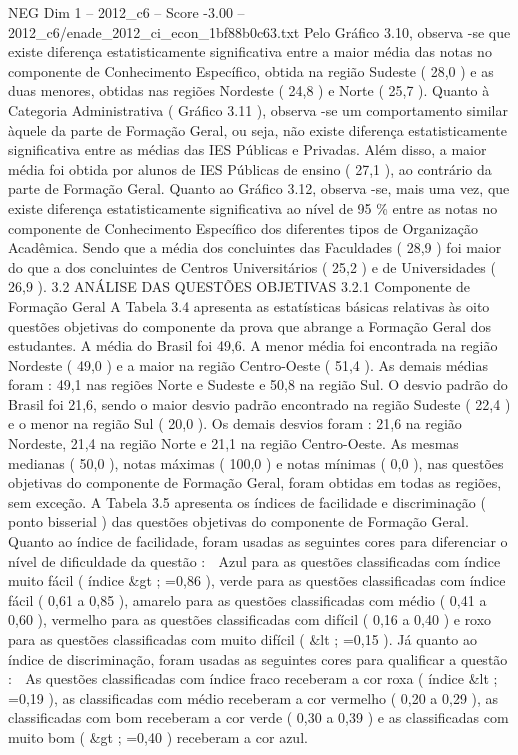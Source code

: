 \begin{textsample}{NEG Dim 1 – 2012\_c6 – Score -3.00 – 2012\_c6/enade\_2012\_ci\_econ\_1bf88b0c63.txt}
Pelo Gráfico 3.10, observa -se que existe diferença estatisticamente significativa entre a maior média das notas no componente de Conhecimento Específico, obtida na região Sudeste ( 28,0 ) e as duas menores, obtidas nas regiões Nordeste ( 24,8 ) e Norte ( 25,7 ).
Quanto à Categoria Administrativa ( Gráfico 3.11 ), observa -se um comportamento similar àquele da parte de Formação Geral, ou seja, não existe diferença estatisticamente significativa entre as médias das IES Públicas e Privadas.
Além disso, a maior média foi obtida por alunos de IES Públicas de ensino ( 27,1 ), ao contrário da parte de Formação Geral.
Quanto ao Gráfico 3.12, observa -se, mais uma vez, que existe diferença estatisticamente significativa ao nível de 95 \% entre as notas no componente de Conhecimento Específico dos diferentes tipos de Organização Acadêmica.
Sendo que a média dos concluintes das Faculdades ( 28,9 ) foi maior do que a dos concluintes de Centros Universitários ( 25,2 ) e de Universidades ( 26,9 ). 3.2 ANÁLISE DAS QUESTÕES OBJETIVAS 3.2.1 Componente de Formação Geral A Tabela 3.4 apresenta as estatísticas básicas relativas às oito questões objetivas do componente da prova que abrange a Formação Geral dos estudantes.
A média do Brasil foi 49,6.
A menor média foi encontrada na região Nordeste ( 49,0 ) e a maior na região Centro-Oeste ( 51,4 ).
As demais médias foram : 49,1 nas regiões Norte e Sudeste e 50,8 na região Sul.
O desvio padrão do Brasil foi 21,6, sendo o maior desvio padrão encontrado na região Sudeste ( 22,4 ) e o menor na região Sul ( 20,0 ).
Os demais desvios foram : 21,6 na região Nordeste, 21,4 na região Norte e 21,1 na região Centro-Oeste.
As mesmas medianas ( 50,0 ), notas máximas ( 100,0 ) e notas mínimas ( 0,0 ), nas questões objetivas do componente de Formação Geral, foram obtidas em todas as regiões, sem exceção.
A Tabela 3.5 apresenta os índices de facilidade e discriminação ( ponto bisserial ) das questões objetivas do componente de Formação Geral.
Quanto ao índice de facilidade, foram usadas as seguintes cores para diferenciar o nível de dificuldade da questão :  Azul para as questões classificadas com índice muito fácil ( índice \&gt ; =0,86 ), verde para as questões classificadas com índice fácil ( 0,61 a 0,85 ), amarelo para as questões classificadas com médio ( 0,41 a 0,60 ), vermelho para as questões classificadas com difícil ( 0,16 a 0,40 ) e roxo para as questões classificadas com muito difícil ( \&lt ; =0,15 ).
Já quanto ao índice de discriminação, foram usadas as seguintes cores para qualificar a questão :  As questões classificadas com índice fraco receberam a cor roxa ( índice \&lt ; =0,19 ), as classificadas com médio receberam a cor vermelho ( 0,20 a 0,29 ), as classificadas com bom receberam a cor verde ( 0,30 a 0,39 ) e as classificadas com muito bom ( \&gt ; =0,40 ) receberam a cor azul.

\end{textsample}
